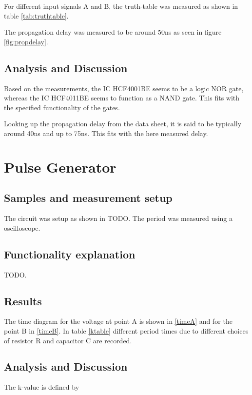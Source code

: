 \documentclass[journal]{IEEEtran}
\begin{document}
For different input signals A and B, the truth-table was measured as
shown in table \ref{tab:truthtable}.

The propagation delay was measured to be around 50ns as seen in figure
\ref{fig:propdelay}.

\subsection{Analysis and Discussion}

Based on the measurements, the IC HCF4001BE seems to be a logic NOR gate,
whereas the IC HCF4011BE seems to function as a NAND gate. This fits with the
specified functionality of the gates.

Looking up the propagation delay from the data sheet, it is said to be typically
around 40ns and up to 75ns. This fits with the here measured delay.

\section{Pulse Generator}

\subsection{Samples and measurement setup}


The circuit was setup as shown in TODO. The period was measured using a
oscilloscope.

\subsection{Functionality explanation}

TODO.

\subsection{Results}

The time diagram for the voltage at point A is shown in \ref{timeA} and for the
point B in \ref{timeB}. In table \ref{ktable} different period times due to
different choices of resistor R and capacitor C are recorded.  

\subsection{Analysis and Discussion}

The k-value is defined by
\end{document}
